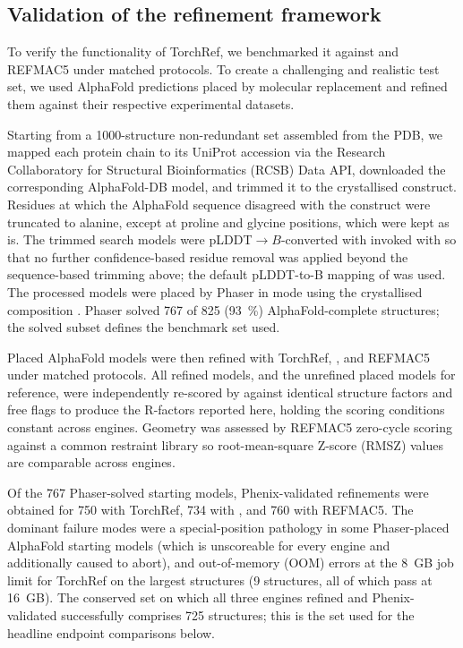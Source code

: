 \documentclass{iucrjournals}
\begin{document}
\subsection{Validation of the refinement framework}\label{sec:validation}

To verify the functionality of TorchRef, we benchmarked it against  and REFMAC5 under
matched protocols. To create a challenging and realistic test set, we used
AlphaFold predictions placed by molecular replacement and refined them against their respective
experimental datasets.

Starting from a \num{1000}-structure non-redundant set assembled from the
PDB, we mapped each protein chain to its UniProt accession via the Research
Collaboratory for Structural Bioinformatics (RCSB) Data API, downloaded the
corresponding AlphaFold-DB model, and trimmed it to the
crystallised construct.  Residues at which the AlphaFold sequence disagreed
with the construct were truncated to alanine, except at proline and glycine
positions, which were kept as is.  The trimmed search models were
pLDDT$\rightarrow B$-converted with 
invoked with  so that no further
confidence-based residue removal was applied beyond the sequence-based
trimming above; the default pLDDT-to-B mapping of
 was used.  The processed models were
placed by Phaser in  mode using the crystallised composition
\cite{mccoy_phaser_2007}.  Phaser solved \num{767} of \num{825} (\SI{93}{\percent})
AlphaFold-complete structures; the solved subset defines the benchmark set
used.

Placed AlphaFold models were then refined with TorchRef, 
\cite{liebschner_macromolecular_2019}, and REFMAC5 \cite{murshudov_refmac5_2011}
under matched protocols.  All refined models, and the unrefined placed models
for reference, were independently re-scored by 
against identical structure factors and free flags to produce the R-factors
reported here, holding the scoring conditions constant across engines.
Geometry was assessed by REFMAC5 zero-cycle scoring against a common restraint
library so root-mean-square Z-score (RMSZ) values are comparable across engines.

Of the \num{767} Phaser-solved starting models, Phenix-validated refinements
were obtained for \num{750} with TorchRef, \num{734} with ,
and \num{760} with REFMAC5. The dominant failure modes were a special-position
pathology in some Phaser-placed AlphaFold starting models (which is unscoreable
for every engine and additionally caused  to abort), and
out-of-memory (OOM) errors at the 8~GB job limit for TorchRef on the largest
structures (\num{9} structures, all of which pass at 16~GB).
The conserved set on which all three engines refined and Phenix-validated
successfully comprises \num{725} structures; this is the set used for the
headline endpoint comparisons below.
\end{document}
